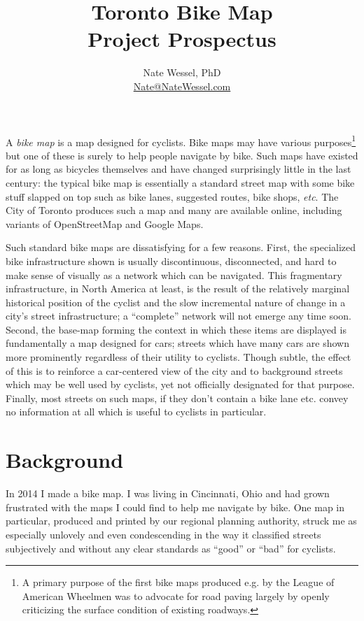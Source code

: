 \documentclass{article}
\title{Toronto Bike Map \\ Project Prospectus}
\author{Nate Wessel, PhD \\ \href{mailto:nate@natewessel.com}{Nate@NateWessel.com}}
\begin{document}
	\maketitle
	A \textit{bike map} is a map designed for cyclists. Bike maps may have various purposes\footnote{A primary purpose of the first bike maps produced e.g. by the League of American Wheelmen was to advocate for road paving largely by openly criticizing the surface condition of existing roadways.} but one of these is surely to help people navigate by bike. Such maps have existed for as long as bicycles themselves and have changed surprisingly little in the last century: the typical bike map is essentially a standard street map with some bike stuff slapped on top such as bike lanes, suggested routes, bike shops, \textit{etc}. 
	The City of Toronto produces such a map and many are available online, including variants of OpenStreetMap and Google Maps. 
	
	Such standard bike maps are dissatisfying for a few reasons. First, the specialized bike infrastructure shown is usually discontinuous, disconnected, and hard to make sense of visually as a network which can be navigated. This fragmentary infrastructure, in North America at least, is the result of the relatively marginal historical position of the cyclist and the slow incremental nature of change in a city's street infrastructure; a ``complete'' network will not emerge any time soon. 
	Second, the base-map forming the context in which these items are displayed is fundamentally a map designed for cars; streets which have many cars are shown more prominently regardless of their utility to cyclists. Though subtle, the effect of this is to reinforce a car-centered view of the city and to background streets which may be well used by cyclists, yet not officially designated for that purpose. Finally, most streets on such maps, if they don't contain a bike lane etc. convey no information at all which is useful to cyclists in particular. 
	
	\section*{Background}
		In 2014 I made a bike map. 
		I was living in Cincinnati, Ohio and had grown frustrated with the maps I could find to help me navigate by bike. One map in particular, produced and printed by our regional planning authority, struck me as especially unlovely and even condescending in the way it classified streets subjectively and without any clear standards as ``good'' or ``bad'' for cyclists. 
		
\end{document}
